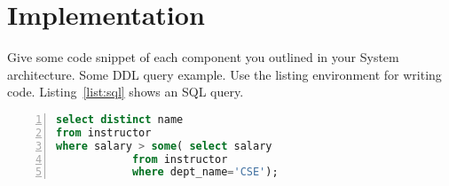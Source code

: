 \section{Implementation}\label{sec:imp}
Give some code snippet of each component you outlined in your System architecture. Some DDL query example. Use the listing environment for writing code. 
Listing~\ref{list:sql} shows an SQL query. 

\begin{lstlisting}[caption={A SQL query example}, label=list:sql, captionpos=b,
           backgroundcolor=\color{white},
           language=SQL,
           breaklines=true,
           frame=single,
           showspaces=false,
           basicstyle=\ttfamily,
           numbers=left,
           numberstyle=\tiny,
           rulecolor=\color{red},
           keywordstyle=\color{blue},
           commentstyle=\color{gray}
        ]
select distinct name
from instructor
where salary > some( select salary
			from instructor
			where dept_name='CSE');
\end{lstlisting}
\clearpage
